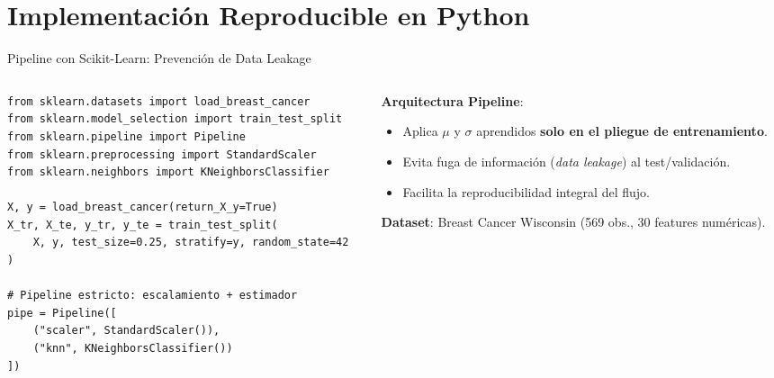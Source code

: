 \section{Implementación Reproducible en Python}

\begin{frame}[fragile]{Pipeline con Scikit-Learn: Prevención de Data Leakage}
\begin{columns}[T,onlytextwidth]
\begin{column}{0.58\textwidth}
\begin{lstlisting}[style=ccdepython]
from sklearn.datasets import load_breast_cancer
from sklearn.model_selection import train_test_split
from sklearn.pipeline import Pipeline
from sklearn.preprocessing import StandardScaler
from sklearn.neighbors import KNeighborsClassifier

X, y = load_breast_cancer(return_X_y=True)
X_tr, X_te, y_tr, y_te = train_test_split(
    X, y, test_size=0.25, stratify=y, random_state=42
)

# Pipeline estricto: escalamiento + estimador
pipe = Pipeline([
    ("scaler", StandardScaler()),
    ("knn", KNeighborsClassifier())
])
\end{lstlisting}
\end{column}

\begin{column}{0.40\textwidth}
\begin{keybox}
\textbf{Arquitectura Pipeline}:
\begin{itemize}\setlength{\itemsep}{0.15em}
  \footnotesize
  \item Aplica $\mu$ y $\sigma$ aprendidos \textbf{solo en el pliegue de entrenamiento}.
  \item Evita fuga de información (\textit{data leakage}) al test/validación.
  \item Facilita la reproducibilidad integral del flujo.
\end{itemize}
\end{keybox}

\vspace{0.10cm}
\begin{ccdebox}
\scriptsize
\textbf{Dataset}: Breast Cancer Wisconsin (569 obs., 30 features numéricas).
\end{ccdebox}
\end{column}
\end{columns}
\end{frame}

